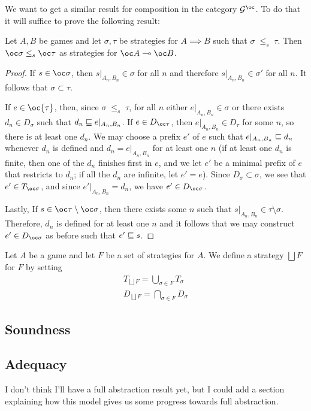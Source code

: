 \documentclass{article}
\newcommand{\stle}{{\;\le_s\;}}
\newcommand{\exlub}{\bigsqcup}
\begin{document}
We want to get a similar result for composition in the category $\G^{\oc}$.  To do that it will suffice to prove the following result:

\begin{proposition}
  Let $A,B$ be games and let $\sigma,\tau$ be strategies for $A\implies B$ such that $\sigma\stle\tau$.  Then $\oc\sigma\stle\oc\tau$ as strategies for $\oc A\implies \oc B$.
  \begin{proof}
    If $s\in\oc\sigma$, then $s\vert_{A_n,B_n}\in\sigma$ for all $n$ and therefore $s\vert_{A_n,B_n}\in\sigma'$ for all $n$.  It follows that $\sigma\subset\tau$.

    If $e\in\oc{\tau}$, then, since $\sigma\stle\tau$, for all $n$ either $e\vert_{A_n,B_n}\in\sigma$ or there exists $d_n\in D_\sigma$ such that $d_n\sqsubseteq e\vert_{A_n,B_n}$.  If $e\in D_{\oc\tau}$, then $e\vert_{A_n,B_n}\in D_\tau$ for some $n$, so there is at least one $d_n$.  We may choose a prefix $e'$ of $e$ such that $e\vert_{A_n,B_n}\sqsubseteq d_n$ whenever $d_n$ is defined and $d_n=e\vert_{A_n,B_n}$ for at least one $n$ (if at least one $d_n$ is finite, then one of the $d_n$ finishes first in $e$, and we let $e'$ be a minimal prefix of $e$ that restricts to $d_n$; if all the $d_n$ are infinite, let $e'=e$).  Since $D_\sigma\subset\sigma$, we see that $e'\in T_{\oc \sigma}$, and since $e'\vert_{A_n,B_n}=d_n$, we have $e'\in D_{\oc\sigma}$.

    Lastly, If $s\in \oc\tau\setminus\oc\sigma$, then there exists some $n$ such that $s\vert_{A_n,B_n}\in\tau\setminus\sigma$.  Therefore, $d_n$ is defined for at least one $n$ and it follows that we may construct $e'\in D_{\oc\sigma}$ as before such that $e'\sqsubseteq s$.
  \end{proof}
\end{proposition}

Let $A$ be a game and let $F$ be a set of strategies for $A$.  We define a strategy $\exlub F$ for $F$ by setting
\begin{gather*}
  T_{\exlub F} = \bigcup_{\sigma\in F}T_\sigma \\
  D_{\exlub F} = \bigcap_{\sigma\in F}D_\sigma
\end{gather*}

\subsection{Soundness}

\subsection{Adequacy}

I don't think I'll have a full abstraction result yet, but I could add a section explaining how this model gives us some progress towards full abstraction.  



\end{document}
